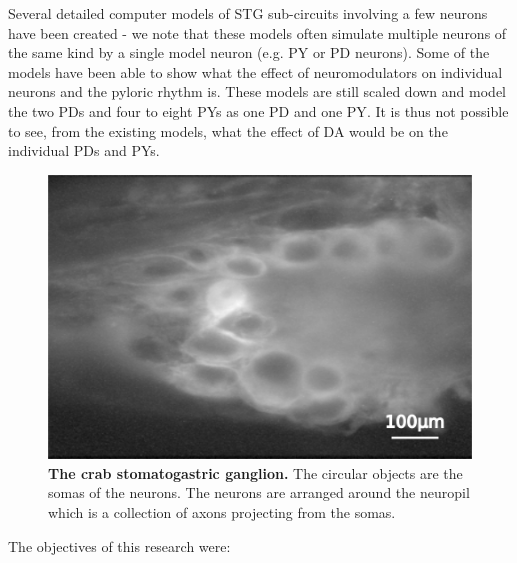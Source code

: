 Several detailed computer models of \ac{STG} sub-circuits involving a few neurons have been created \cite{Soto-Trevino2005, Golowasch1999a} - we note that these models often simulate multiple neurons of the same kind by a single model neuron (e.g. \ac{PY} or \ac{PD} neurons). Some of the models have been able to show what the effect of neuromodulators on individual neurons and the pyloric rhythm is. These models are still scaled down and model the two \acp{PD} and four to eight \acp{PY} as one \ac{PD} and one \ac{PY}. It is thus not possible to see, from the existing models, what the effect of \ac{DA} would be on the individual \ac{PD}s and \ac{PY}s.

\begin{figure}[H]
	\centering
		\includegraphics[]{graphics/stg_vsd.png}
		\caption[The crab stomatogastric ganglion.]{\textbf{The crab stomatogastric ganglion.} The circular objects are the somas of the neurons. The neurons are arranged around the neuropil which is a collection of axons projecting from the somas.} 
		\label{fig:STG1}
\end{figure}

The objectives of this research were:

